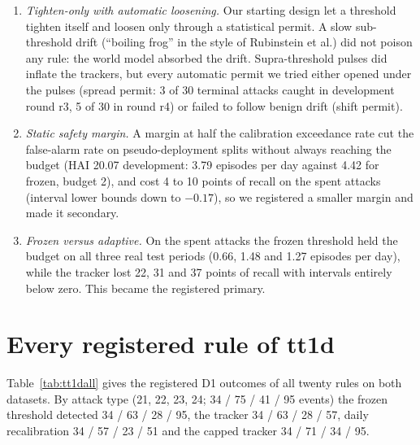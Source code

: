\documentclass[sigconf]{acmart}
\begin{document}
\begin{enumerate}
\item \emph{Tighten-only with automatic loosening.} Our starting design let a threshold tighten
  itself and loosen only through a statistical permit. A slow sub-threshold drift (``boiling frog''
  in the style of Rubinstein et al.) did not poison any rule: the world model absorbed the drift.
  Supra-threshold pulses did inflate the trackers, but every automatic permit we tried either opened
  under the pulses (spread permit: 3 of 30 terminal attacks caught in development round r3, 5 of 30
  in round r4) or failed to follow benign drift (shift permit).
\item \emph{Static safety margin.} A margin at half the calibration exceedance rate cut the
  false-alarm rate on pseudo-deployment splits without always reaching the budget (HAI 20.07
  development: 3.79 episodes per day against 4.42 for frozen, budget 2), and cost 4 to 10 points of
  recall on the spent attacks (interval lower bounds down to $-0.17$), so we registered a smaller
  margin and made it secondary.
\item \emph{Frozen versus adaptive.} On the spent attacks the frozen threshold held the budget on
  all three real test periods (0.66, 1.48 and 1.27 episodes per day), while the tracker lost 22, 31
  and 37 points of recall with intervals entirely below zero. This became the registered primary.
\end{enumerate}

\FloatBarrier
\section{Every registered rule of tt1d}
\label{app:tt1d}

Table~\ref{tab:tt1dall} gives the registered D1 outcomes of all twenty rules on both datasets. By attack
type (21, 22, 23, 24; 34 / 75 / 41 / 95 events) the frozen threshold detected 34 / 63 / 28 / 95, the tracker
34 / 63 / 28 / 57, daily recalibration 34 / 57 / 23 / 51 and the capped tracker 34 / 71 / 34 / 95.
\end{document}
